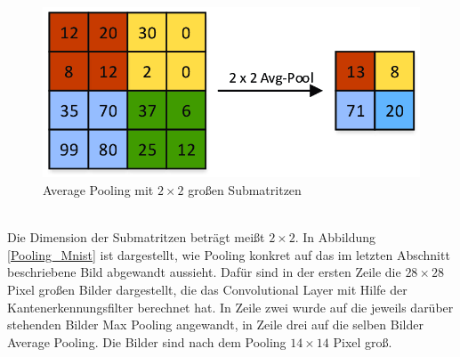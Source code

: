\documentclass[11pt]{article}
\begin{document}
\begin{figure}[h]
	\centering
	\includegraphics[width=0.7\linewidth]{../graphics/Average-Pooling-Example.png}
	\caption[Average Pooling mit $2\times2$ großen Submatritzen\newline
	Aus: Dominguez-Morales, Juan Pedro. (2018). Neuromorphic audio processing through real-time embedded spiking neural networks. Abbildung 33]{Average Pooling mit $2\times2$ großen Submatritzen}
	\label{AvgPool}
\end{figure}
\\
Die Dimension der Submatritzen beträgt meißt $2\times2$. In Abbildung \ref{Pooling_Mnist} ist dargestellt, wie Pooling konkret auf das im letzten Abschnitt beschriebene Bild abgewandt aussieht. Dafür sind in der ersten Zeile die $28\times28$ Pixel großen Bilder dargestellt, die das Convolutional Layer mit Hilfe der Kantenerkennungsfilter berechnet hat. In Zeile zwei wurde auf die jeweils darüber stehenden Bilder Max Pooling angewandt, in Zeile drei auf die selben Bilder Average Pooling. Die Bilder sind nach dem Pooling $14\times14$ Pixel groß.
\end{document}
